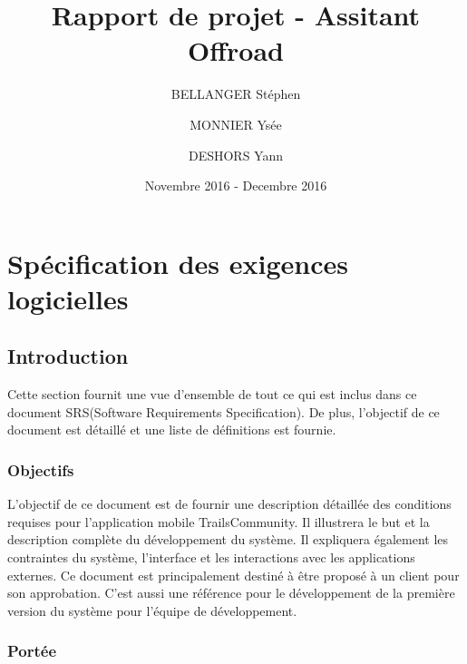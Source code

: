 \documentclass[titlepage, 12pt]{report}
\title{Rapport de projet - Assitant Offroad}
\author{BELLANGER Stéphen \and
			MONNIER Ysée \and
			DESHORS Yann}
\date{Novembre 2016 - Decembre 2016}
\begin{document}
	
\maketitle

\tableofcontents

\listoffigures 

\part{Spécification des exigences logicielles}

\chapter{Introduction}

Cette section fournit une vue d'ensemble de tout ce qui est inclus dans ce document SRS(Software Requirements Specification). De plus, l'objectif de ce document est détaillé et une liste de définitions est fournie.

\section{Objectifs}

L'objectif de ce document est de fournir une description détaillée des conditions requises pour l'application mobile TrailsCommunity.
Il illustrera le but et la description complète du développement du système.
Il expliquera également les contraintes du système, l'interface et les interactions avec les applications externes. Ce document est principalement destiné à être proposé à un client pour son approbation. C'est aussi une référence pour le développement de la première version du système pour l'équipe de développement.

\section{Portée}
\end{document}
